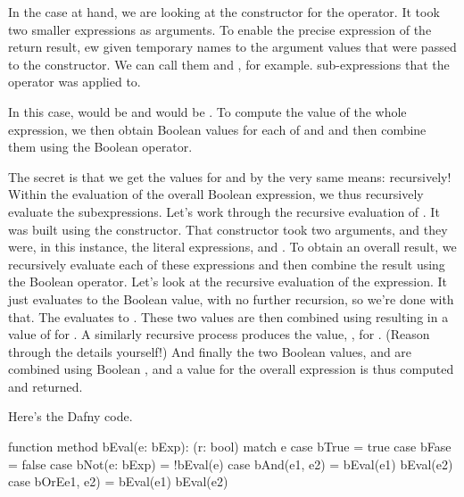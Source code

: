 \documentclass[letterpaper,10pt,english]{sphinxmanual}
\begin{document}
In the case at hand, we are looking at the constructor for the 
operator. It took two smaller expressions as arguments. To enable the
precise expression of the return result, ew given temporary names to
the argument values that were passed to the constructor. We can call
them  and , for example.
sub-expressions that the operator was applied to.

In this case,  would be  and  would be . To compute the value of the whole expression, we then obtain
Boolean values for each of  and  and then combine them using
the Boolean  operator.

The secret is that we get the values for  and  by the very
same means: recursively! Within the evaluation of the overall Boolean
expression, we thus recursively evaluate the subexpressions. Let’s
work through the recursive evaluation of . It was built using the
 constructor. That constructor took two arguments, and they were,
in this instance, the literal expressions,  and . To
obtain an overall result, we recursively evaluate each of these
expressions and then combine the result using the Boolean 
operator. Let’s look at the recursive evaluation of the 
expression. It just evaluates to the Boolean value,  with no
further recursion, so we’re done with that. The  evaluates to
. These two values are then combined using  resulting in
a value of  for . A similarly recursive process produces
the value, , for . (Reason through the details yourself!)
And finally the two Boolean values,  and  are combined
using Boolean , and a value for the overall expression is thus
computed and returned.

Here’s the Dafny code.

\begin{sphinxVerbatim}[commandchars=\\\{\}]
function method bEval(e: bExp): (r: bool)
\PYGZob{}
    match e
    \PYGZob{}
        case bTrue =\PYGZgt{} true
        case bFase =\PYGZgt{} false
        case bNot(e: bExp) =\PYGZgt{} !bEval(e)
        case bAnd(e1, e2) =\PYGZgt{} bEval(e1) \PYGZam{}\PYGZam{} bEval(e2)
        case bOrEe1, e2) =\PYGZgt{}  bEval(e1) \textbar{}\textbar{} bEval(e2)
    \PYGZcb{}
\PYGZcb{}
\end{sphinxVerbatim}
\end{document}

